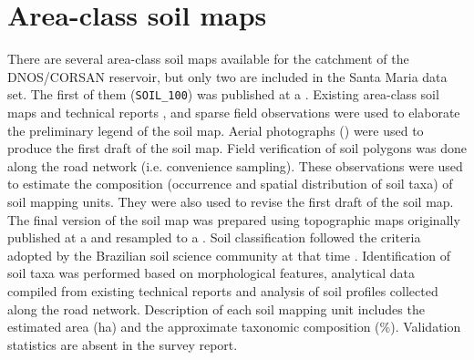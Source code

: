 \tocless\section{Area-class soil maps}
\label{sec:covar-data-soil-maps}

There are several area-class soil maps available for the catchment of the DNOS/CORSAN reservoir, but 
only two are included in the Santa Maria data set. The first of them (\texttt{SOIL\_100}) was 
published at a  \cite{AzolinEtAl1988}. Existing area-class soil maps and technical 
reports \cite{Brasil1973,Azolin1977,MacielEtAl1987a,MacielEtAl1987,AbraoEtAl1988}, and sparse field 
observations were used to elaborate the preliminary legend of the soil map. Aerial photographs 
() were used to produce the first draft of the soil map. Field verification of soil 
polygons was done along the road network (i.e. convenience sampling). These observations were used 
to estimate the composition (occurrence and spatial distribution of soil taxa) of soil mapping 
units. They were also used to revise the first draft of the soil map. The final version of the soil 
map was prepared using topographic maps originally published at a  and resampled to a 
. Soil classification followed the criteria adopted by the Brazilian soil science 
community at that time \cite{Brasil1973,CamargoEtAl1982,Carvalho1982,LemosEtAl1982,OlmosEtAl1982}. 
Identification of soil taxa was performed based on morphological features, analytical data compiled 
from existing technical reports and analysis of soil profiles collected along the road network. 
Description of each soil mapping unit includes the estimated area (\si{\hectare}) and the 
approximate taxonomic composition (\si{\percent}). Validation statistics are absent in the survey 
report.

